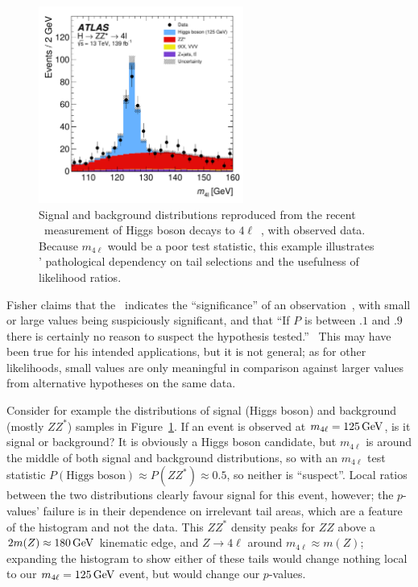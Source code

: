 \begin{figure}[tp]
\centering
\includegraphics[width=0.6\textwidth]{figures/searches_atlas_higgs_4l_2207_00320.pdf}
\caption[
Signal and background distributions reproduced from the recent \atlas\
measurement of Higgs boson decays to $4\ell$
]{%
Signal and background distributions reproduced from the recent \atlas\
measurement of Higgs boson decays to $4\ell$~\cite{ATLAS:2022net}, with
observed data.
Because $m_{4\ell}$ would be a poor test statistic, this example illustrates
\pvalues' pathological dependency on tail selections and the usefulness of
likelihood ratios.
}
\label{fig:searches_atlas_higgs_4l}
\end{figure}

Fisher claims that the \pvalue\ indicates the ``significance'' of an
observation~\cite{fisher1925smrw}, with small or large values being
suspiciously significant, and that
``If $P$ is between $.1$ and $.9$ there is certainly no reason to suspect the
hypothesis tested.''~\cite{fisher1925smrw}
This may have been true for his intended applications, but it is not general;
as for other likelihoods, small values are only meaningful in comparison
against larger values from alternative hypotheses on the same data.

Consider for example the distributions of signal (Higgs boson) and background
(mostly $ZZ^*$) samples in Figure~\ref{fig:searches_atlas_higgs_4l}.
If an event is observed at $m_{4\ell} = 125\,\eV[G]$, is it signal or
background?
It is obviously a Higgs boson candidate, but $m_{4\ell}$ is around the middle
of both signal and background distributions, so with an $m_{4\ell}$ test
statistic $P(\textrm{Higgs boson}) \approx P(ZZ^*) \approx 0.5$, so neither
is ``suspect''.
Local ratios between the two distributions clearly favour signal for this
event, however; the $p$-values' failure is in their dependence on irrelevant
tail areas, which are a feature of the histogram and not the data.
This $ZZ^*$ density peaks for $ZZ$ above a
$2 m(Z) \approx 180\,\eV[G]$ kinematic edge,
and $Z \to 4\ell$ around $m_{4\ell} \approx m(Z)$;
expanding the histogram to show either of these tails would change nothing
local to our $m_{4\ell} = 125\,\eV[G]$ event, but would change our $p$-values.


